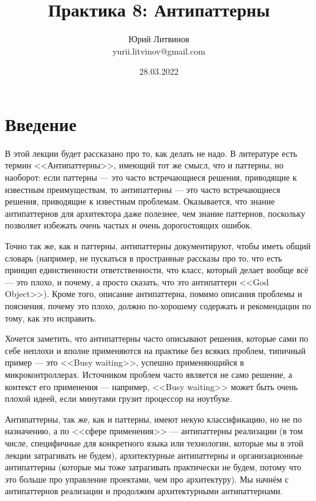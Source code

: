 \documentclass[a5paper]{article}
\title{Практика 8: Антипаттерны}
\author{Юрий Литвинов\\\small{yurii.litvinov@gmail.com}}
\date{28.03.2022}
\begin{document}
\maketitle
\thispagestyle{empty}

\section{Введение}

В этой лекции будет рассказано про то, как делать не надо. В литературе есть термин <<Антипаттерны>>, имеющий тот же смысл, что и паттерны, но наоборот: если паттерны --- это часто встречающиеся решения, приводящие к известным преимуществам, то антипаттерны --- это часто встречающиеся решения, приводящие к известным проблемам. Оказывается, что знание антипаттернов для архитектора даже полезнее, чем знание паттернов, поскольку позволяет избежать очень частых и очень дорогостоящих ошибок.

Точно так же, как и паттерны, антипаттерны документируют, чтобы иметь общий словарь (например, не пускаться в пространные рассказы про то, что есть принцип единственности ответственности, что класс, который делает вообще всё --- это плохо, и почему, а просто сказать, что это антипаттерн <<God Object>>). Кроме того, описание антипаттерна, помимо описания проблемы и пояснения, почему это плохо, должно по-хорошему содержать и рекомендации по тому, как это исправить. 

Хочется заметить, что антипаттерны часто описывают решения, которые сами по себе неплохи и вполне применяются на практике без всяких проблем, типичный пример --- это <<Busy waiting>>, успешно применяющийся в микроконтроллерах. Источником проблем часто является не само решение, а контекст его применения --- например, <<Busy waiting>> может быть очень плохой идеей, если минутами грузит процессор на ноутбуке.

Антипаттерны, так же, как и паттерны, имеют некую классификацию, но не по назначению, а по <<сфере применения>> --- антипаттерны реализации (в том числе, специфичные для конкретного языка или технологии, которые мы в этой лекции затрагивать не будем), архитектурные антипаттерны и организационные антипаттерны (которые мы тоже затрагивать практически не будем, потому что это больше про управление проектами, чем про архитектуру). Мы начнём с антипаттернов реализации и продолжим архитектурными антипаттернами.
\end{document}
